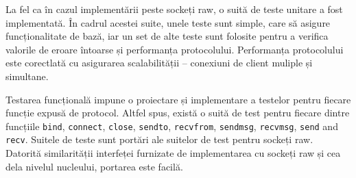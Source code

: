 La fel ca în cazul implementării peste sockeți raw, o suită de teste unitare a
fost implementată. În cadrul acestei suite, unele teste sunt simple, care să
asigure funcționalitate de bază, iar un set de alte teste sunt folosite pentru a
verifica valorile de eroare întoarse și performanța protocolului. Performanța
protocolului este corectlată cu asigurarea scalabilității -- conexiuni de
client muliple și simultane.

Testarea funcțională impune o proiectare și implementare a testelor pentru
fiecare funcție expusă de protocol. Altfel spus, există o suită de test pentru
fiecare dintre funcțiile \texttt{bind}, \texttt{connect}, \texttt{close},
\texttt{sendto}, \texttt{recvfrom}, \texttt{sendmsg}, \texttt{recvmsg},
\texttt{send} and \texttt{recv}. Suitele de teste sunt portări ale suitelor
de test pentru sockeți raw. Datorită similarității interfeței furnizate de
implementarea cu sockeți raw și cea dela nivelul nucleului, portarea este
facilă.
